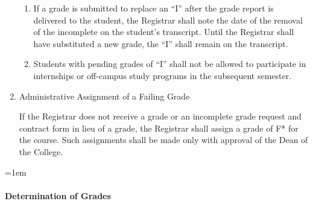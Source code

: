 \documentclass{manual}
\let\oldparagraph\paragraph
\renewcommand\paragraph{\leftskip=1em\oldparagraph}
\newcommand{\itemLevelA}{\alph*.}
\newcommand{\itemLevelB}{\arabic*)}
\newcommand{\itemRefA}{\alph*}
\newcommand{\itemRefB}{\arabic*}
\begin{document}
\begin{enumerate}[label=\itemLevelA,ref=\itemRefA]
\begin{enumerate}[label=\itemLevelB,ref=\itemRefB]
\item If a grade is submitted to replace an ``I'' after the grade report is delivered to the student, the Registrar shall note the date of the removal of the incomplete on the student's transcript. Until the Registrar shall have substituted a new grade, the ``I'' shall remain on the transcript.

\item Students with pending grades of ``I'' shall not be allowed to participate in internships or off-campus study programs in the subsequent semester.
\end{enumerate}

\item Administrative Assignment of a Failing Grade

If the Registrar does not receive a grade or an incomplete grade request and contract form in lieu of a grade, the Registrar shall assign a grade of F* for the course. Such assignments shall be made only with approval of the Dean of the College.
\end{enumerate}




\paragraph{Determination of Grades}\label{par:DeterminationOfGrades}
\end{document}
